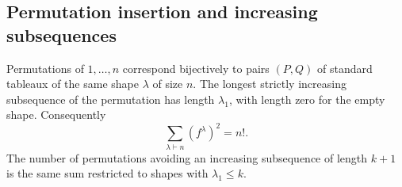 \subsection{Permutation insertion and increasing subsequences}

\begin{theorem}\label{result17}
Permutations of \(1,\ldots,n\) correspond bijectively to pairs \((P,Q)\)
of standard tableaux of the same shape \(\lambda\) of size \(n\).
The longest strictly increasing subsequence of the permutation has length
\(\lambda_1\), with length zero for the empty shape. Consequently
\[
  \sum_{\lambda\vdash n}(f^\lambda)^2=n!.
\]
The number of permutations avoiding an increasing subsequence of length
\(k+1\) is the same sum restricted to shapes with \(\lambda_1\le k\).
\end{theorem}
